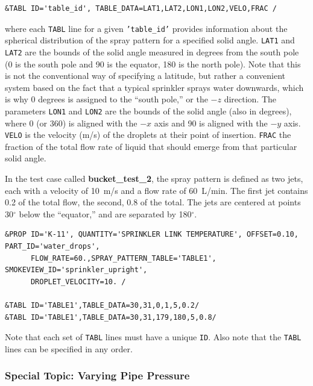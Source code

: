 \documentclass[11pt]{book}
\newcommand{\ct}{\tt\small}
\begin{document}
\footnotesize
\begin{verbatim}
&TABL ID='table_id', TABLE_DATA=LAT1,LAT2,LON1,LON2,VELO,FRAC /
\end{verbatim} \normalsize

\noindent
where each {\ct TABL} line for a given {\ct 'table\_id'} provides information about the spherical distribution of the spray pattern
for a specified solid angle. {\ct LAT1} and {\ct LAT2} are the bounds of the solid angle measured in degrees from
the south pole (0 is the south pole and 90 is the equator, 180 is the north pole).  Note that this is not the conventional way of
specifying a latitude, but rather a convenient system based on the fact that a typical sprinkler sprays water downwards, which is
why 0 degrees is assigned to the ``south pole,'' or the $-z$ direction. The parameters {\ct LON1} and {\ct LON2} are the
bounds of the solid angle (also in degrees),
where 0 (or 360) is aligned with the $-x$ axis and 90 is aligned with the $-y$ axis.  {\ct VELO} is the velocity (m/s) of the droplets at their
point of insertion.
{\ct FRAC} the fraction of the total flow rate of liquid that should emerge from that particular solid angle.

In the test case called {\bf bucket\_test\_2}, the spray pattern is defined as two jets, each with a velocity of 10~m/s and a flow rate
of 60~L/min. The first jet contains 0.2 of the total flow, the second, 0.8 of the total.
The jets are centered at points 30$^\circ$ below the ``equator,'' and are separated by 180$^\circ$.

\footnotesize
\begin{verbatim}
&PROP ID='K-11', QUANTITY='SPRINKLER LINK TEMPERATURE', OFFSET=0.10, PART_ID='water_drops',
      FLOW_RATE=60.,SPRAY_PATTERN_TABLE='TABLE1', SMOKEVIEW_ID='sprinkler_upright',
      DROPLET_VELOCITY=10. /

&TABL ID='TABLE1',TABLE_DATA=30,31,0,1,5,0.2/
&TABL ID='TABLE1',TABLE_DATA=30,31,179,180,5,0.8/
\end{verbatim}
\normalsize


\begin{warning}
\noindent
Note that each set of {\ct TABL} lines must have a unique {\ct ID}.  Also note that
the {\ct TABL} lines can be specified in any order.
\end{warning}




\subsubsection{Special Topic: Varying Pipe Pressure}
\label{info:pressureramp}
\end{document}
